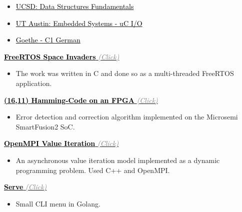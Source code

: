 \documentclass[10pt,a4paper,ragged2e,withhyper]{altacv}
\begin{document}
\begin{paracol}{2}

\divider

\divider

\divider


\begin{itemize}
	\item \href{https://courses.edx.org/certificates/f9250573933e4a3e87e8b28ea989bf99}{{\textcolor{black}{UCSD: Data Structures Fundamentals}}}
	\item \href{https://courses.edx.org/certificates/af6115bce0c646aa95f6aaa6c98acb09}{{\textcolor{black}{UT Austin: Embedded Systems - uC I/O}}}
	\item \href{https://drive.google.com/file/d/1o92biySEgdC3Jg6H8UU-0r6dPcCCKwKe/view?usp=sharing}{{\textcolor{black}{Goethe - C1 German}}}
\end{itemize}



\href{https://github.com/duclos-cavalcanti/FreeRTOS-SpaceInvaders}
     {\textbf{{\textcolor{black}{FreeRTOS Space Invaders}}} \textit{\textcolor{gray}{(Click)}}}
\begin{itemize}
	\item The work was written in C and done so as a multi-threaded FreeRTOS application. 
\end{itemize}

\href{https://github.com/duclos-cavalcanti/microsemi-error-detection}
     {\textbf{{\textcolor{black}{(16,11) Hamming-Code on an FPGA}}} \textit{\textcolor{gray}{(Click)}}}
\begin{itemize}
    \item Error detection and correction algorithm implemented on the Microsemi SmartFusion2 SoC.
\end{itemize}

\href{https://github.com/duclos-cavalcanti/Open-MPI-ValueIteration}
     {\textbf{{\textcolor{black}{OpenMPI Value Iteration}}} \textit{\textcolor{gray}{(Click)}}}
\begin{itemize}
	\item An asynchronous value iteration model implemented as a dynamic programming problem. Used C++ and OpenMPI.
\end{itemize}

\href{https://github.com/duclos-cavalcanti/serve}
     {\textbf{{\textcolor{black}{Serve}}} \textit{\textcolor{gray}{(Click)}}}
\begin{itemize}
	\item Small CLI menu in Golang.
\end{itemize}

\end{paracol}
\end{document}
